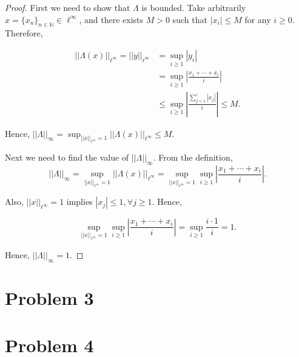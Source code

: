 \documentclass[12pt]{article}
\begin{document}
\begin{proof}

First we need to show that $\Lambda$ is bounded. Take arbitrarily $x = \{ x_n \}_{n\in\mathbb N}\in\ell^\infty$, and there exists $M>0$ such that $|x_i| \leqslant M$ for any $i \geqslant 0$. Therefore, 

$$
\begin{aligned}
||\Lambda(x)||_{\ell^\infty} = ||y||_{\ell^\infty} & = \sup_{i\geqslant 1} |y_i| \\
& = \sup_{i\geqslant 1} \left|\frac{x_1 + \cdots + x_i}{i}\right| \\
& \leqslant \sup_{i\geqslant 1} \left|\frac{\sum_{j=1}^i|x_j|}{i}\right| \leqslant M.
\end{aligned}
$$ 

Hence, $||\Lambda||_\infty = \sup_{||x||_{\ell^\infty} = 1} ||\Lambda(x)||_{\ell^\infty} \leqslant M$.

Next we need to find the value of $||\Lambda||_\infty$. From the definition, 
$$
||\Lambda||_\infty = \sup_{||x||_{\ell^\infty} = 1} ||\Lambda(x)||_{\ell^\infty} = \sup_{||x||_{\ell^\infty} = 1}\sup_{i\geqslant 1}\left| \frac{x_1 + \cdots + x_i}{i} \right|.
$$

Also, $||x||_{\ell^\infty} = 1$ implies $|x_j| \leqslant 1, \forall j\geqslant 1$. Hence, 

$$
\sup_{||x||_{\ell^\infty} = 1}\sup_{i\geqslant 1}\left| \frac{x_1 + \cdots + x_i}{i} \right| = \sup_{i\geqslant 1} \frac{i\cdot 1}{i} = 1.
$$

Hence, $||\Lambda||_\infty = 1$.

\end{proof}

\section*{Problem 3}




\section*{Problem 4}
\end{document}

